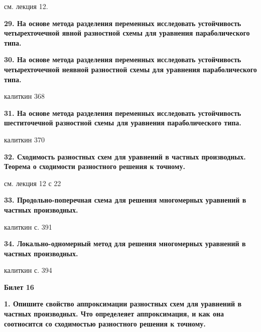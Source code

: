 \documentclass[a4paper,14pt]{article}
\begin{document}
\begin{figure}[!h]
	\label{fig:t283}
\end{figure}

см. лекция 12.

\textbf{29. На основе метода разделения переменных исследовать устойчивость четырехточечной явной разностной схемы для уравнения параболического типа.}

\textbf{30. На основе метода разделения переменных исследовать устойчивость четырехточечной неявной разностной схемы для уравнения параболического типа.}

калиткин 368

\textbf{31. На основе метода разделения переменных исследовать устойчивость шеститочечной разностной схемы для уравнения параболического типа.}

калиткин 370

\textbf{32. Сходимость разностных схем для уравнений в частных производных. Теорема о сходимости разностного решения к точному.}

см. лекция 12 с 22

\textbf{33. Продольно-поперечная схема для решения многомерных уравнений в частных производных.}

калиткин с. 391

\textbf{34. Локально-одномерный метод для решения многомерных уравнений в частных производных.}

калиткин с. 394

\textbf{Билет 16}

\textbf{1. Опишите свойство аппроксимации разностных схем для уравнений в частных производных.
Что определеяет аппроксимация, и как она соотносится со сходимостью разностного решения к точному.}
\end{document}
